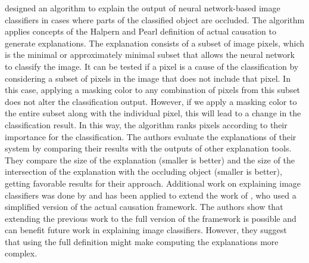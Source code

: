 	
	\citet{Chockler2021} designed an algorithm to explain the output of neural network-based image classifiers in cases where parts of the classified object are occluded. The algorithm applies concepts of the Halpern and Pearl definition of actual causation to generate explanations. The explanation consists of a subset of image pixels, which is the minimal or approximately minimal subset that allows the neural network to classify the image. It can be tested if a pixel is a cause of the classification by considering a subset of pixels in the image that does not include that pixel. In this case, applying a masking color to any combination of pixels from this subset does not alter the classification output. However, if we apply a masking color to the entire subset along with the individual pixel, this will lead to a change in the classification result. In this way, the algorithm ranks pixels according to their importance for the classification. The authors evaluate the explanations of their system by comparing their results with the outputs of other explanation tools. They compare the size of the explanation (smaller is better) and the size of the intersection of the explanation with the occluding object (smaller is better), getting favorable results for their approach. Additional work on explaining image classifiers was done by \citet{Chockler2024} and has been applied to extend the work of \citet{KommiyaMothilal2021}, who used a simplified version of the actual causation framework. The authors show that extending the previous work to the full version of the framework is possible and can benefit future work in explaining image classifiers. However, they suggest that using the full definition might make computing the explanations more complex.